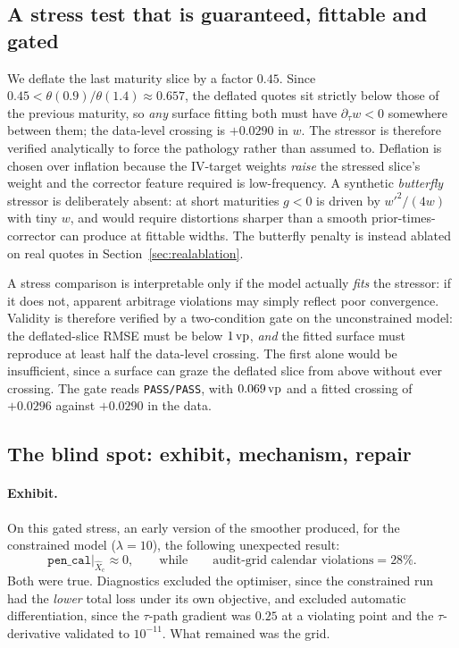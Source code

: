 \subsection{A stress test that is guaranteed, fittable and gated}\label{sec:stress}

We deflate the last maturity slice by a factor $0.45$. Since
$0.45<\theta(0.9)/\theta(1.4)\approx0.657$, the deflated quotes sit strictly below those of the
previous maturity, so \emph{any} surface fitting both must have $\partial_\tau w<0$ somewhere
between them; the data-level crossing is $+0.0290$ in $w$. The stressor is therefore verified
analytically to force the pathology rather than assumed to. Deflation is chosen over inflation
because the IV-target weights \emph{raise} the stressed slice's weight and the corrector feature
required is low-frequency. A synthetic \emph{butterfly} stressor is deliberately absent: at
short maturities $g<0$ is driven by $w'^2/(4w)$ with tiny $w$, and would require distortions
sharper than a smooth prior-times-corrector can produce at fittable widths. The butterfly
penalty is instead ablated on real quotes in Section~\ref{sec:realablation}.

A stress comparison is interpretable only if the model actually \emph{fits} the stressor: if it
does not, apparent arbitrage violations may simply reflect poor convergence. Validity is
therefore verified by a two-condition gate on the unconstrained model: the deflated-slice RMSE
must be below $1\,\text{vp}$, \emph{and} the fitted surface must reproduce at least half the
data-level crossing. The first alone would be insufficient, since a surface can graze the
deflated slice from above without ever crossing. The gate reads \texttt{PASS/PASS}, with
$0.069\,\text{vp}$ and a fitted crossing of $+0.0296$ against $+0.0290$ in the data.

\subsection{The blind spot: exhibit, mechanism, repair}\label{sec:blindspot}

\paragraph{Exhibit.} On this gated stress, an early version of the smoother produced, for the
constrained model ($\lambda=10$), the following unexpected result:
\[
\texttt{pen\_cal}\big|_{\hat X_{\mathrm c}} \approx 0,
\qquad\text{while}\qquad
\text{audit-grid calendar violations}=28\%.
\]
Both were true. Diagnostics excluded the optimiser, since the constrained run had the
\emph{lower} total loss under its own objective, and excluded automatic differentiation, since
the $\tau$-path gradient was $0.25$ at a violating point and the $\tau$-derivative validated to
$10^{-11}$. What remained was the grid.

